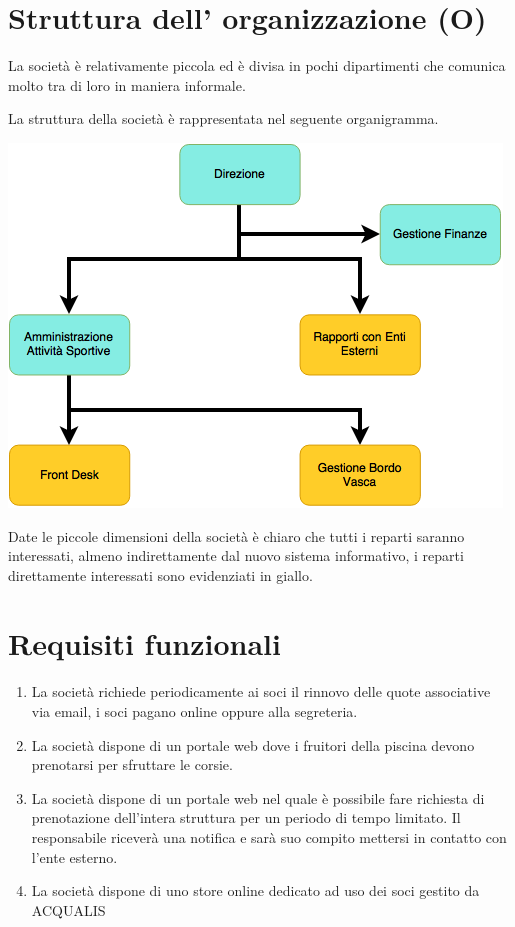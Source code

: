 \documentclass[11pt]{article} %
\begin{document}
\section{Struttura dell' organizzazione (O)}

La società è relativamente piccola ed è divisa in pochi dipartimenti che comunica molto tra di loro in maniera informale.

La struttura della società è rappresentata nel seguente organigramma.

\vspace{0.75in}
\includegraphics[scale=0.7]{Organigramma}
\vspace{0.75in}

Date le piccole dimensioni della società è chiaro che tutti i reparti saranno interessati, almeno indirettamente dal nuovo sistema informativo, i reparti direttamente interessati sono evidenziati in giallo.

\section{Requisiti funzionali}

\begin{enumerate}
	\item La società richiede periodicamente ai soci il rinnovo delle quote associative via email, i soci pagano online oppure alla segreteria.
	\item La società dispone di un portale web dove i fruitori della piscina devono prenotarsi per sfruttare le corsie.
	\item La società dispone di un portale web nel quale è possibile fare richiesta di prenotazione dell'intera struttura per un periodo di tempo limitato. Il responsabile riceverà una notifica e sarà suo compito mettersi in contatto con l'ente esterno.
	\item La società dispone di uno store online dedicato ad uso dei soci gestito da ACQUALIS
\end{enumerate}
\end{document}
